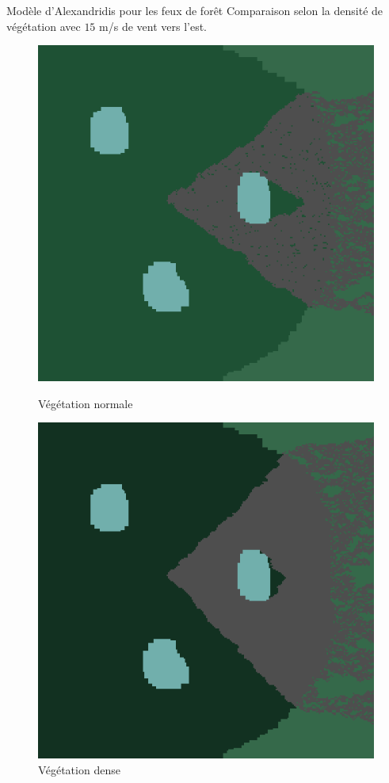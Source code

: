 \documentclass{beamer}
\begin{document}
\begin{frame}{Modèle d'Alexandridis pour les feux de forêt \hyperlink{jump}{\beamerbutton{ }} \hypertarget{12}{\beamerbutton{ }}}
    Comparaison selon la densité de végétation avec $15$ m/s de vent vers l'est.

    \begin{figure}[!htb]
        \begin{minipage}{0.48\textwidth}
          \centering
          \includegraphics[width=.8\linewidth]{pictures/model2/land_200_wind_notdense.png}
          \caption{Végétation normale}\label{Fig:Data1}
        \end{minipage}\hfill
        \begin{minipage}{0.48\textwidth}
          \centering
          \includegraphics[width=.8\linewidth]{pictures/model2/land_200_wind_dense.png}
          \caption{Végétation dense}\label{Fig:Data2}
        \end{minipage}
     \end{figure}
\end{frame}
\end{document}
